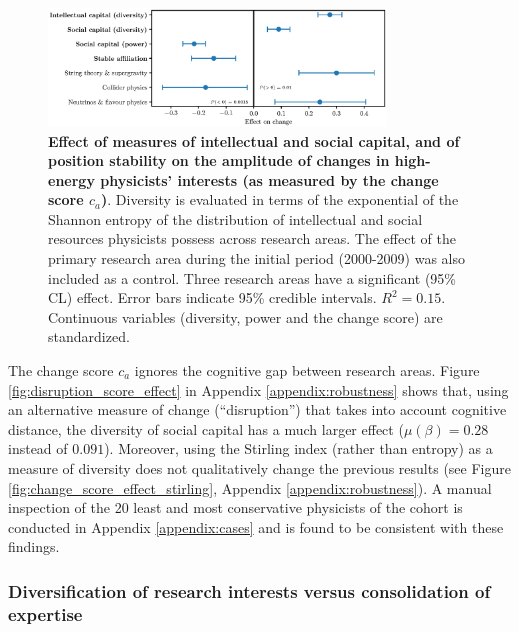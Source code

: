 \documentclass{article}
\begin{document}
\begin{figure}[h]
    \centering
    \includegraphics[width=0.8\textwidth]{plots/change_score_effects_entropy_magnitude.eps}
    \caption{\textbf{Effect of measures of intellectual and social capital, and of position stability on the amplitude of changes in high-energy physicists' interests (as measured by the change score $c_a$)}. Diversity is evaluated in terms of the exponential of the Shannon entropy of the distribution of intellectual and social resources physicists possess across research areas. The effect of the primary research area during the initial period (2000-2009) was also included as a control. Three research areas have a significant (95\% CL) effect. Error bars indicate 95\% credible intervals. $R^2=0.15$. Continuous variables (diversity, power and the change score) are standardized.}
    \label{fig:change_score_effect}
\end{figure}

The change score $c_a$ ignores the cognitive gap between research areas. Figure \ref{fig:disruption_score_effect} in Appendix \ref{appendix:robustness} shows that, using an alternative measure of change (``disruption'') that takes into account cognitive distance, the diversity of social capital has a much larger effect ($\mu(\beta)=0.28$ instead of $0.091$). Moreover, using the Stirling index (rather than entropy) as a measure of diversity does not qualitatively change the previous results (see Figure \ref{fig:change_score_effect_stirling}, Appendix \ref{appendix:robustness}). A manual inspection of the 20 least and most conservative physicists of the cohort is conducted in Appendix \ref{appendix:cases} and is found to be consistent with these findings.

\subsubsection{Diversification of research interests versus consolidation of expertise}
\end{document}

